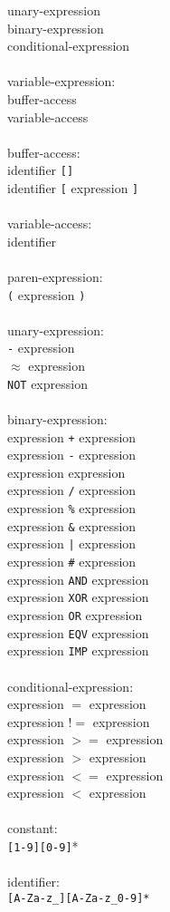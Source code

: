 \documentclass[12pt]{article}
\newcommand{\kw}[1]{{\tt #1}}
\begin{document}
\begin{tabbing}
\> unary-expression\\
\> binary-expression\\
\> conditional-expression\\
\\
variable-expression:\\
\> buffer-access\\
\> variable-access\\
\\
buffer-access:\\
\> identifier \kw{[]}\\
\> identifier \kw{[} expression \kw{]}\\
\\
variable-access:\\
\> identifier\\
\\
paren-expression:\\
\> \kw{(} expression \kw{)}\\
\\
unary-expression:\\
\> \kw{-} expression\\
\> $\approx$ expression\\
\> \kw{NOT} expression\\
\\
binary-expression:\\
\> expression \kw{+} expression\\
\> expression \kw{-} expression\\
\> expression \kw{*} expression\\
\> expression \kw{/} expression\\
\> expression \kw{\%} expression\\
\> expression \kw{\&} expression\\
\> expression \kw{|} expression\\
\> expression \kw{\#} expression\\
\> expression \kw{AND} expression\\
\> expression \kw{XOR} expression\\
\> expression \kw{OR} expression\\
\> expression \kw{EQV} expression\\
\> expression \kw{IMP} expression\\
\\
conditional-expression:\\
\> expression $=$ expression\\
\> expression $!=$ expression\\
\> expression $>=$ expression\\
\> expression $>$ expression\\
\> expression $<=$ expression\\
\> expression $<$ expression\\
\\
constant:\\
\> \kw{[1-9][0-9]}*\\
\\
identifier:\\
\> \kw{[A-Za-z\_][A-Za-z\_0-9]*}\\

\end{tabbing}
\end{document}
